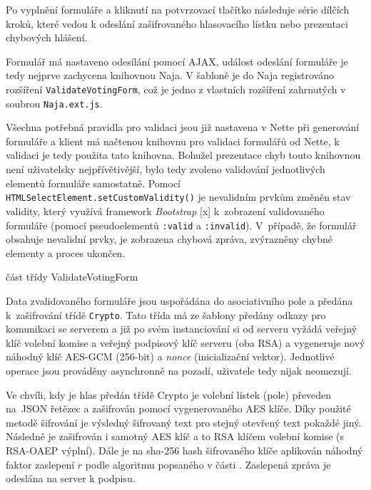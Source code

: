 Po vyplnění formuláře a kliknutí na potvrzovací tlačítko následuje série dílčích kroků, které vedou k odeslání zašifrovaného hlasovacího lístku nebo prezentaci chybových hlášení.


Formulář má nastaveno odesílání pomocí AJAX, událost odeslání formuláře je tedy nejprve zachycena knihovnou Naja. V šabloně je do Naja registrováno rozšíření \texttt{ValidateVotingForm}, což je jedno z vlastních rozšíření zahrnutých v soubrou \texttt{Naja.ext.js}.

Všechna potřebná pravidla pro validaci jsou již nastavena v Nette při generování formuláře a klient má načtenou knihovnu pro validaci formulářů od Nette, k validaci je tedy použita tato knihovna. Bohužel prezentace chyb touto knihovnou není uživatelsky nejpřívětivější, bylo tedy zvoleno validování jednotlivých elementů formuláře samostatně. Pomocí \texttt{HTMLSelectElement.setCustomValidity()} je nevalidním prvkům změněn stav validity, který využívá framework \textit{Bootstrap} [x] k~zobrazení validovaného formuláře (pomocí pseudoelementů \texttt{:valid} a \texttt{:invalid}). V~případě, že formulář obsahuje nevalidní prvky, je zobrazena chybová zpráva, zvýrazněny chybné elementy a proces ukončen.

\begin{listing}[ht]
\caption{část třídy ValidateVotingForm}
\label{php:validace}
\end{listing}

Data zvalidovaného formuláře jsou uspořádána do asociativního pole a předána k~zašifrování třídě \texttt{Crypto}. Tato třída má ze šablony předány odkazy pro komunikaci se serverem a již po svém instanciování si od serveru vyžádá veřejný klíč volební komise a veřejný podpisový klíč serveru (oba RSA) a vygeneruje nový náhodný klíč AES-GCM (256-bit) a \textit{nonce} (inicializační vektor). Jednotlivé operace jsou prováděny asynchronně na pozadí, uživatele tedy nijak neomezují.

Ve chvíli, kdy je hlas předán třídě Crypto je volební lístek (pole) převeden na~JSON řetězec a zašifrován pomocí vygenerovaného AES klíče. Díky použité metodě šifrování je výsledný šifrovaný text pro stejný otevřený text pokaždé jiný. Následně je zašifrován i samotný AES klíč a to RSA klíčem volební komise (s RSA-OAEP výplní). Dále je na sha-256 hash šifrovaného klíče aplikován náhodný faktor zaslepení $r$ podle algoritmu popsaného v části . Zaslepená zpráva je odeslána na server k podpisu.


